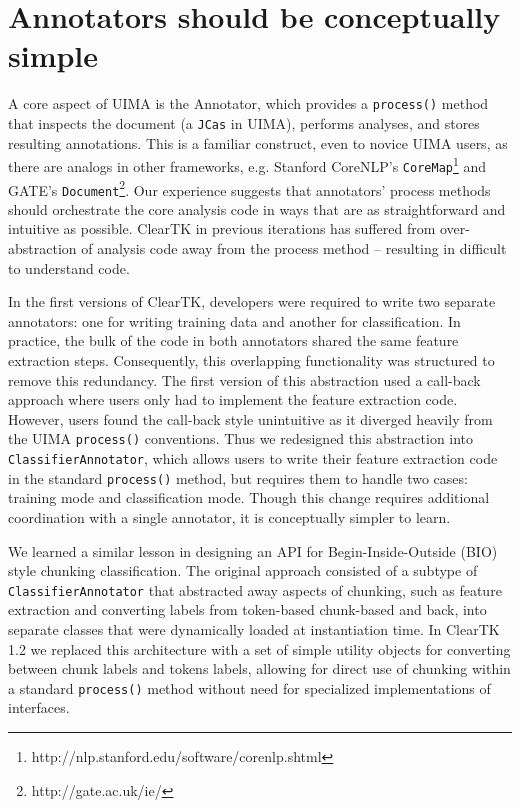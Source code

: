 \documentclass[10pt, a4paper]{article}
\newcommand{\code}[1]{\texttt{\small #1}}
\begin{document}
\section{Annotators should be conceptually simple}
\label{sec:annotators}
A core aspect of UIMA is the Annotator, which provides a \code{process()} method that inspects the document (a \code{JCas} in UIMA), performs analyses, and stores resulting annotations.  This is a familiar construct, even to novice UIMA users, as there are analogs in other frameworks, e.g. Stanford CoreNLP's \code{CoreMap}\footnote{http://nlp.stanford.edu/software/corenlp.shtml} and GATE's \code{Document}\footnote{http://gate.ac.uk/ie/}.  Our experience suggests that annotators' process methods should orchestrate the core analysis code in ways that are as straightforward and intuitive as possible.  ClearTK in previous iterations has suffered from over-abstraction of analysis code away from the process method -- resulting in difficult to understand code.

In the first versions of ClearTK, developers were required to write two separate annotators: one for writing training data and another for classification.  In practice, the bulk of the code in both annotators shared the same feature extraction steps.  Consequently, this overlapping functionality was structured to remove this redundancy.  The first version of this abstraction used a call-back approach where users only had to implement the feature extraction code.  However, users found the call-back style unintuitive as it diverged heavily from the UIMA \code{process()} conventions.  
Thus we redesigned this abstraction into \code{ClassifierAnnotator}, which allows users to write their feature extraction code in the standard \code{process()} method, but requires them to handle two cases: training mode and classification mode.  Though this change requires additional coordination with a single annotator, it is conceptually simpler to learn.

We learned a similar lesson in designing an API for Begin-Inside-Outside (BIO) style chunking classification.
The original approach consisted of a subtype of \code{ClassifierAnnotator} that abstracted away aspects of chunking, such as feature extraction and converting labels from token-based chunk-based and back, into separate classes that were dynamically loaded at instantiation time.
In ClearTK 1.2 we replaced this architecture with a set of simple utility objects for converting between chunk labels and tokens labels, allowing for direct use of chunking within a standard \code{process()} method without need for specialized implementations of interfaces.
\end{document}
